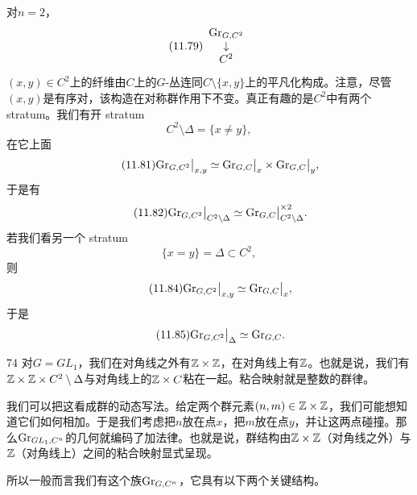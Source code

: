 对$n=2$，
\begin{equation}\tag{11.79}
\begin{array}{ccc}
\mathrm{Gr}_{G,C^{2}} & & \\
\downarrow & & \\
C^{2} & &
\end{array}
\end{equation}
$(x,y)\in C^{2}$上的纤维由$C$上的$G$-丛连同$C\setminus\{x,y\}$上的平凡化构成。注意，尽管$(x,y)$是有序对，该构造在对称群作用下不变。真正有趣的是$C^{2}$中有两个 stratum。我们有开 stratum
\begin{equation}\tag{11.80}
C^{2}\setminus\Delta=\{x\ne y\},
\end{equation}
在它上面
\begin{equation}\tag{11.81}
\mathrm{Gr}_{G,C^{2}}\big|_{x,y}\simeq\mathrm{Gr}_{G,C}\big|_{x}\times\mathrm{Gr}_{G,C}\big|_{y},
\end{equation}
于是有
\begin{equation}\tag{11.82}
\mathrm{Gr}_{G,C^{2}}\big|_{C^{2}\setminus\Delta}\simeq\mathrm{Gr}_{G,C}\big|^{\times 2}_{C^{2}\setminus\Delta}.
\end{equation}
若我们看另一个 stratum
\begin{equation}\tag{11.83}
\{x=y\}=\Delta\subset C^{2},
\end{equation}
则
\begin{equation}\tag{11.84}
\mathrm{Gr}_{G,C^{2}}\big|_{x,y}\simeq\mathrm{Gr}_{G,C}\big|_{x},
\end{equation}
于是
\begin{equation}\tag{11.85}
\mathrm{Gr}_{G,C^{2}}\big|_{\Delta}\simeq\mathrm{Gr}_{G,C}.
\end{equation}

\begin{srcex}{74}
对$G=GL_1$，我们在对角线之外有$\mathbb{Z}\times\mathbb{Z}$，在对角线上有$\mathbb{Z}$。也就是说，我们有$\mathbb{Z}\times\mathbb{Z}\times C^{2}\setminus\Delta$与对角线上的$\mathbb{Z}\times C$粘在一起。粘合映射就是整数的群律。
\end{srcex}

我们可以把这看成群的动态写法。给定两个群元素$(n,m)\in\mathbb{Z}\times\mathbb{Z}$，我们可能想知道它们如何相加。于是我们考虑把$n$放在点$x$，把$m$放在点$y$，并让这两点碰撞。那么$\mathrm{Gr}_{GL_1,C^{n}}$的几何就编码了加法律。也就是说，群结构由$\mathbb{Z}\times\mathbb{Z}$（对角线之外）与$\mathbb{Z}$（对角线上）之间的粘合映射显式呈现。

所以一般而言我们有这个族$\mathrm{Gr}_{G,C^{n}}$，它具有以下两个关键结构。


